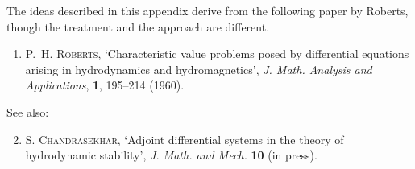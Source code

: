 The ideas described in this appendix derive from the following paper by Roberts,
though the treatment and the approach are different.

\begin{enumerate}
\item P.~H. \textsc{Roberts}, `Characteristic value problems posed by differential equations arising in hydrodynamics and hydromagnetics', \textit{J. Math. Analysis
and Applications}, \textbf{1}, 195--214 (1960).
\end{enumerate}

\noindent See also:

\begin{enumerate}
\setcounter{enumi}{1}
\item S. \textsc{Chandrasekhar}, `Adjoint differential systems in the theory of hydrodynamic stability', \textit{J. Math. and Mech.} \textbf{10} (in press).
\end{enumerate}
